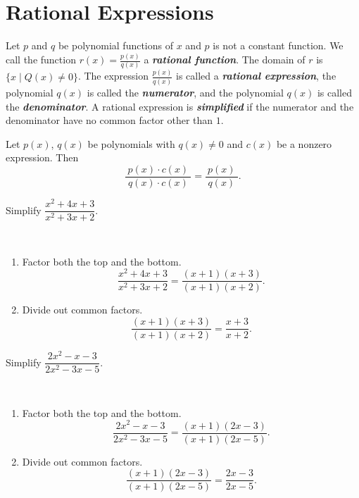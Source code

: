 \documentclass[
  en,11pt]{elegantbook}
\let\BeginKnitrBlock\begin \let\EndKnitrBlock\end
\begin{document}
\hypertarget{rational-expressions}{%
\section{Rational Expressions}\label{rational-expressions}}

Let \(p\) and \(q\) be polynomial functions of \(x\) and \(p\) is not a constant function. We call the function \(r(x)=\frac{p(x)}{q(x)}\) a \textbf{\emph{rational function}}. The domain of \(r\) is \(\{x\mid Q(x)\neq 0\}\).
The expression \(\frac{p(x)}{q(x)}\) is called a \textbf{\emph{rational expression}}, the polynomial \(q(x)\) is called the \textbf{\emph{numerator}}, and the polynomial \(q(x)\) is called the \textbf{\emph{denominator}}.
A rational expression is \textbf{\emph{simplified}} if the numerator and the denominator have no common factor other than \(1\).

Let \(p(x)\), \(q(x)\) be polynomials with \(q(x)\neq 0\) and \(c(x)\) be a nonzero expression. Then
\[
\dfrac{~p(x)\cdot c(x)~}{~q(x)\cdot c(x)~}=\dfrac{~p(x)~}{~q(x)~}.
\]

\BeginKnitrBlock{example}
\protect\hypertarget{exm:unnamed-chunk-33}{}{\label{exm:unnamed-chunk-33} }
Simplify \(\dfrac{x^2+4x+3}{x^2+3x+2}\).
\EndKnitrBlock{example}

\BeginKnitrBlock{solution}
{}\\

\begin{enumerate}
\def\labelenumi{\arabic{enumi}.}
\item
  Factor both the top and the bottom.
  \[
   \dfrac{x^2+4x+3}{x^2+3x+2}=\dfrac{(x+1)(x+3)}{(x+1)(x+2)}.
  \]
\item
  Divide out common factors.
  \[
   \dfrac{(x+1)(x+3)}{(x+1)(x+2)}=\dfrac{x+3}{x+2}.
  \]
\end{enumerate}
\EndKnitrBlock{solution}

\BeginKnitrBlock{example}
\protect\hypertarget{exm:unnamed-chunk-35}{}{\label{exm:unnamed-chunk-35} }
Simplify \(\dfrac{2x^2-x-3}{2x^2-3x-5}\).
\EndKnitrBlock{example}

\BeginKnitrBlock{solution}
{}\\

\begin{enumerate}
\def\labelenumi{\arabic{enumi}.}
\item
  Factor both the top and the bottom.
  \[\dfrac{2x^2-x-3}{2x^2-3x-5}=\dfrac{(x+1)(2x-3)}{(x+1)(2x-5)}.\]
\item
  Divide out common factors.
  \[\dfrac{(x+1)(2x-3)}{(x+1)(2x-5)}=\dfrac{2x-3}{2x-5}.\]
\end{enumerate}
\EndKnitrBlock{solution}
\end{document}
